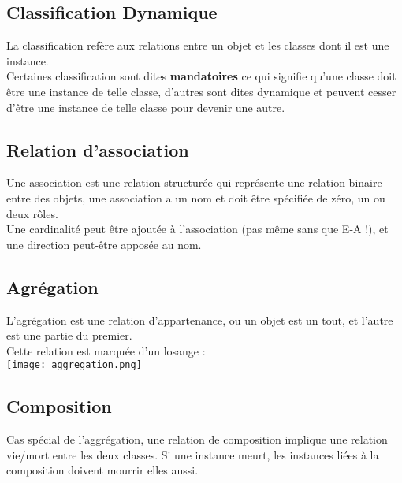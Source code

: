 \documentclass{report}
\begin{document}
		\subsection{Classification Dynamique}

			La classification refère aux relations entre un objet et les classes dont il est une instance.\\

			Certaines classification sont dites \textbf{mandatoires} ce qui signifie qu'une classe doit être une instance de telle classe, d'autres sont dites dynamique et peuvent cesser d'être une instance de telle classe pour devenir une autre.\\

		\subsection{Relation d'association}

			Une association est une relation structurée qui représente une relation binaire entre des objets, une association a un nom et doit être spécifiée de zéro, un ou deux rôles.\\

			Une cardinalité peut être ajoutée à l'association (pas même sans que E-A !), et une direction peut-être apposée au nom.\\

		\subsection{Agrégation}

			L'agrégation est une relation d'appartenance, ou un objet est un tout, et l'autre est une partie du premier.\\

			Cette relation est marquée d'un losange : \\

			\texttt{[image: aggregation.png]}\\

		\subsection{Composition}

			Cas spécial de l'aggrégation, une relation de composition implique une relation vie/mort entre les deux classes. Si une instance meurt, les instances liées à la composition doivent mourrir elles aussi.\\
\end{document}
